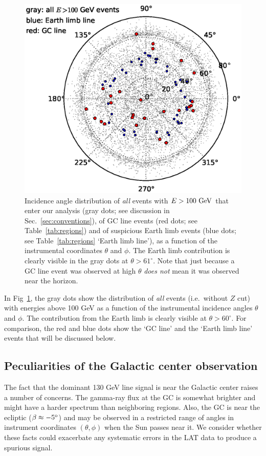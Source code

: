\documentclass[aps,twocolumn,prd,superscriptaddress,showpacs,nofootinbib,fixfloat]{revtex4}
\newcommand{\GeV}{{\rm ~GeV}}
\newcommand{\degree}{^{\rm o}}
\begin{document}
\begin{figure}[h]
  \begin{center}
    \includegraphics[width=0.9\linewidth]{plots/polarCounts.eps}
    \vspace{-0.5cm}
  \end{center}
  \caption{Incidence angle distribution of \emph{all} events
  with $E>100\GeV$ that enter our analysis (gray dots; see
  discussion in Sec.~\ref{sec:conventions}), of GC line
  events (red dots; see Table~\ref{tab:regions}) and of
  suspicious Earth limb events (blue dots; see
  Table~\ref{tab:regions} `Earth limb line'), as a function of
  the instrumental coordinates $\theta$ and $\phi$. The
  Earth limb contribution is clearly visible in the gray
  dots at $\theta > 61^\circ$.  Note that just because a GC line event was
  observed at high $\theta$ \emph{does not} mean it was observed near the
  horizon.}
  \label{fig:phiThetaDist}
\end{figure}

In
Fig~\ref{fig:phiThetaDist}, the gray dots show the
distribution of \emph{all} events (i.e.~without $Z$ cut)
with energies above 100 GeV as a function of the instrumental
incidence angles $\theta$ and $\phi$.
The contribution from the Earth limb is clearly visible at
$\theta>60^\circ$. For comparison, the red and blue dots
show the `GC line' and the `Earth limb line' events that
will be discussed below.

\subsection{Peculiarities of the Galactic center observation}
The fact that the dominant 130 GeV line signal is near the
Galactic center raises a number of concerns.  The gamma-ray
flux at the GC is somewhat brighter and might have a harder
spectrum than neighboring regions. Also, the GC is near the
ecliptic ($\beta \approx -5\degree$) and may be observed in
a restricted range of angles in instrument coordinates
$(\theta, \phi)$ when the Sun passes near it.  We consider
whether these facts could exacerbate any systematic errors
in the LAT data to produce a spurious signal.
\end{document}
